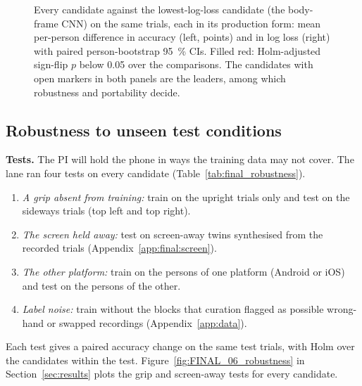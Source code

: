 \begin{figure}[htbp]
  \centering
  \caption{Every candidate against the lowest-log-loss candidate (the body-frame CNN) on the same trials, each in its production form: mean per-person difference in accuracy (left, points) and in log loss (right) with paired person-bootstrap 95~\% CIs.
    Filled red: Holm-adjusted sign-flip $p$ below 0.05 over the  comparisons.
    The candidates with open markers in both panels are the leaders, among which robustness and portability decide.}
  \label{fig:FINAL_04_paired}\label{fig:app:final-paired}
\end{figure}


\subsection{Robustness to unseen test conditions}\label{app:final:robustness}

\textbf{Tests.}
The PI will hold the phone in ways the training data may not cover.
The lane ran four tests on every candidate (Table~\ref{tab:final_robustness}).
\begin{enumerate}[nosep]
  \item \emph{A grip absent from training:} train on the upright trials only and test on the sideways trials (top left and top right).
  \item \emph{The screen held away:} test on screen-away twins synthesised from the recorded trials (Appendix~\ref{app:final:screen}).
  \item \emph{The other platform:} train on the persons of one platform (Android or iOS) and test on the persons of the other.
  \item \emph{Label noise:} train without the blocks that curation flagged as possible wrong-hand or swapped recordings (Appendix~\ref{app:data}).
\end{enumerate}
Each test gives a paired accuracy change on the same test trials, with Holm over the candidates within the test.
Figure~\ref{fig:FINAL_06_robustness} in Section~\ref{sec:results} plots the grip and screen-away tests for every candidate.

